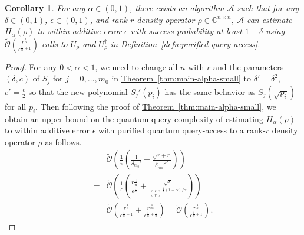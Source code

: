 \documentclass[journal]{IEEEtran}
\newtheorem{corollary}{Corollary}
\newcommand{\thm}[1]{\hyperref[thm:#1]{Theorem~\ref*{thm:#1}}}
\newcommand{\defn}[1]{\hyperref[defn:#1]{Definition~\ref*{defn:#1}}}
\begin{document}
\begin{corollary}
  \label{cor:low-rank-small-alpha}
For any $\alpha \in(0,1)$, there exists an algorithm $\mathcal{A}$ such that for any $\delta \in (0,1)$, $\epsilon\in(0,1)$, and rank-$r$ density operator $\rho\in \mathbb{C}^{n\times n}$, $\mathcal{A}$ can estimate $H_{\alpha}(\rho)$ to within additive error $\epsilon$
  with success probability at least $1-\delta$ using $\widetilde{\mathcal{O}}\left(\frac{r^{\frac{1}{\alpha}}}{\epsilon^{\frac{1}{\alpha}+1}}\right)$ calls to $U_{\rho}$ and $U_{\rho}^{\dagger}$ in \defn{purified-query-access}.
\end{corollary}
\begin{proof}
For any $0<\alpha<1$, we need to change all $n$ with $r$ and the parameters $(\delta,c)$ of $S_j$ for $j=0,\ldots,m_0$ in \thm{main-alpha-small} to $\delta' = \delta^2$, $c'= \frac{c}{2}$ so that the new polynomial $S_j'(p_i)$ has the same behavior as $S_j(\sqrt{p_i})$ for all $p_i$. Then following the proof of \thm{main-alpha-small}, we obtain an upper bound on the quantum query complexity of estimating $H_{\alpha}(\rho)$ to within additive error $\epsilon$ with purified quantum query-access to a rank-$r$ density operator $\rho$ as follows.
\begin{align}
  &\widetilde{\mathcal{O}}\left(\frac{1}{\epsilon}\left(\frac{1}{\delta_{m_0}'} + \frac{\sqrt{r + r}}{\delta_{m_0}'^{c'}}\right)\right) \nonumber \\
  = & \widetilde{\mathcal{O}}\left(\frac{1}{\epsilon}\left(\frac{r{\frac{1}{\alpha}}}{\epsilon^{\frac{1}{\alpha}}} + \frac{\sqrt{r}}{\left(\frac{\epsilon}{r}\right)^{\frac{1}{2}(1-\alpha)/\alpha}}\right)\right) \nonumber \\ 
  = & \widetilde{\mathcal{O}}\left(\frac{r^{\frac{1}{\alpha}}}{\epsilon^{\frac{1}{\alpha} + 1}}+\frac{r^{\frac{1}{2\alpha}}}{\epsilon^{\frac{1}{\alpha}+\frac{1}{2}}}\right) 
  = \widetilde{\mathcal{O}}\left(\frac{r^{\frac{1}{\alpha}}}{\epsilon^{\frac{1}{\alpha}+1}}\right).\label{eq:low-rank-small-alpha}
\end{align}
\end{proof}
\end{document}
